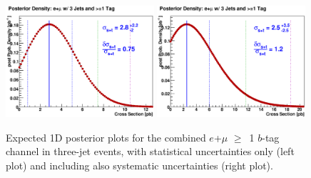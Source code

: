 \vspace{0.1in}
\begin{figure}[!h!tbp]
\includegraphics[width=0.49\textwidth]
{eps/MatrixElement/posterior/nosys/expected_limit_TBTQ_LeptonsCombined_3Jet_TagsCombined}
\includegraphics[width=0.49\textwidth]
{eps/MatrixElement/posterior/sys/expected_limit_TBTQ_LeptonsCombined_3Jet_TagsCombined}
\vspace{-0.1in}
\caption{Expected 1D posterior plots for the combined
$e$+$\mu$ $\geq$~1 $b$-tag channel in three-jet events, with
statistical uncertainties only (left plot) and including also
systematic uncertainties (right plot).}
\label{exp-post-1d-3j}
\end{figure}

